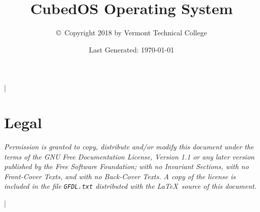 \documentclass{scrreprt}
\begin{document}
\title{CubedOS Operating System}
\author{\copyright\ Copyright 2018 by Vermont Technical College}
\date{Last Generated: \today}
\maketitle

\tableofcontents

\lstMakeShortInline|

\section*{Legal}
\label{sec:legal}

\textit{Permission is granted to copy, distribute and/or modify this document under the terms of
  the GNU Free Documentation License, Version 1.1 or any later version published by the Free
  Software Foundation; with no Invariant Sections, with no Front-Cover Texts, and with no
  Back-Cover Texts. A copy of the license is included in the file \texttt{GFDL.txt} distributed
  with the \LaTeX\ source of this document.}






\newpage


\lstDeleteShortInline|




\end{document}

